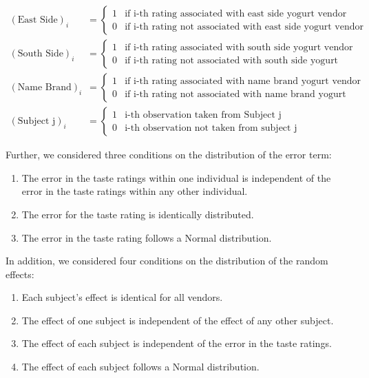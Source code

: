 \documentclass[]{book}
\providecommand{\tightlist}{%
  \setlength{\itemsep}{0pt}\setlength{\parskip}{0pt}}
\theoremstyle{plain}
\theoremstyle{mydefn}
\theoremstyle{myexmpl}
\theoremstyle{remark}
\begin{document}
\[
\begin{aligned}
  (\text{East Side})_i &= \begin{cases}
    1 & \text{if i-th rating associated with east side yogurt vendor} \\
    0 & \text{if i-th rating not associated with east side yogurt vendor}
    \end{cases} \\
  (\text{South Side})_i &= \begin{cases}
    1 & \text{if i-th rating associated with south side yogurt vendor} \\
    0 & \text{if i-th rating not associated with south side yogurt vendor}
    \end{cases} \\
  (\text{Name Brand})_i &= \begin{cases}
    1 & \text{if i-th rating associated with name brand yogurt vendor} \\
    0 & \text{if i-th rating not associated with name brand yogurt vendor}
    \end{cases} \\
  (\text{Subject j})_i &= \begin{cases}
  1 & \text{i-th observation taken from Subject j} \\
  0 & \text{i-th observation not taken from subject j}
  \end{cases}
\end{aligned}
\]

Further, we considered three conditions on the distribution of the error
term:

\begin{enumerate}
\def\labelenumi{\arabic{enumi}.}
\tightlist
\item
  The error in the taste ratings within one individual is independent of
  the error in the taste ratings within any other individual.
\item
  The error for the taste rating is identically distributed.
\item
  The error in the taste rating follows a Normal distribution.
\end{enumerate}

In addition, we considered four conditions on the distribution of the
random effects:

\begin{enumerate}
\def\labelenumi{\arabic{enumi}.}
\tightlist
\item
  Each subject's effect is identical for all vendors.
\item
  The effect of one subject is independent of the effect of any other
  subject.
\item
  The effect of each subject is independent of the error in the taste
  ratings.
\item
  The effect of each subject follows a Normal distribution.
\end{enumerate}
\end{document}
